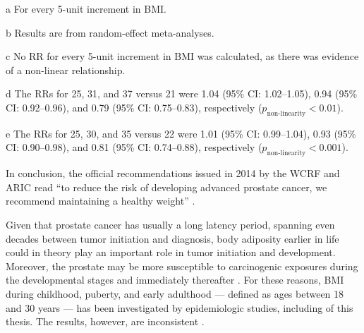 \begin{table}
\begin{threeparttable}
\begin{tablenotes}
\item [a] \footnotesize For every 5-unit increment in BMI.
\item [b] \footnotesize Results are from random-effect meta-analyses.
\item [c] \footnotesize No RR for every 5-unit increment in BMI was calculated, as there was evidence of a non-linear relationship.
\item [d] \footnotesize The RRs for 25, 31, and 37 \kgmsq{} versus 21 \kgmsq{} were 1.04 (95\% CI: 1.02--1.05), 0.94 (95\% CI: 0.92--0.96), and 0.79 (95\% CI: 0.75--0.83), respectively ($p_{\textrm{non-linearity}}<0.01$). 
\item [e] \footnotesize The RRs for 25, 30, and 35 \kgmsq{} versus 22 \kgmsq{} were 1.01 (95\% CI: 0.99--1.04), 0.93 (95\% CI: 0.90--0.98), and 0.81 (95\% CI: 0.74--0.88), respectively ($p_{\textrm{non-linearity}}<0.001$). 
\end{tablenotes}
\end{threeparttable}
\end{table}

In conclusion, the official recommendations issued in 2014 by the WCRF and ARIC read ``to reduce the risk of developing advanced prostate cancer, we recommend maintaining a healthy weight'' \citep{wcrf_continuous_2014}.

Given that prostate cancer has usually a long latency period, spanning even decades between tumor initiation and diagnosis, body adiposity earlier in life could in theory play an important role in tumor initiation and development. Moreover, the prostate may be more susceptible to carcinogenic exposures during the developmental stages and immediately thereafter \citep{sutcliffe_prostate_2013}. For these reasons, BMI during childhood, puberty, and early adulthood --- defined as ages between 18 and 30 years  --- has been investigated by epidemiologic studies, including  of this thesis. The results, however, are inconsistent  \citep{sutcliffe_prostate_2013}. 
\newpage %
